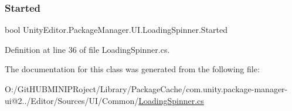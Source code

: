 \subsubsection{\texorpdfstring{Started}{Started}}
{\footnotesize\ttfamily bool Unity\+Editor.\+Package\+Manager.\+U\+I.\+Loading\+Spinner.\+Started\hspace{0.3cm}{\ttfamily [get]}}



Definition at line 36 of file Loading\+Spinner.\+cs.



The documentation for this class was generated from the following file\+:\begin{DoxyCompactItemize}
\item 
O\+:/\+Git\+H\+U\+B\+M\+I\+N\+I\+P\+Roject/\+Library/\+Package\+Cache/com.\+unity.\+package-\/manager-\/ui@2../\+Editor/\+Sources/\+U\+I/\+Common/\mbox{\hyperlink{_loading_spinner_8cs}{Loading\+Spinner.\+cs}}\end{DoxyCompactItemize}

